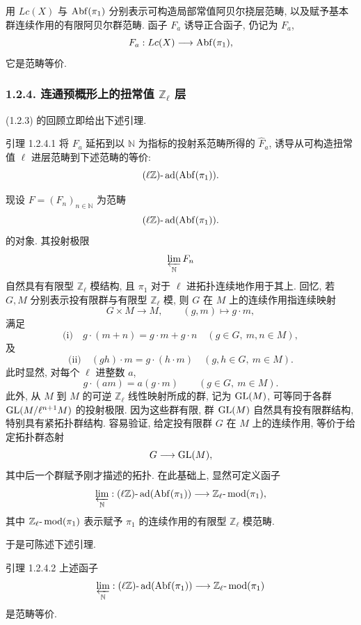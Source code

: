 用 \(Lc(X)\) 与 \(\operatorname{Abf}(\pi_1)\) 分别表示可构造局部常值阿贝尔挠层范畴, 以及赋予基本群连续作用的有限阿贝尔群范畴. 函子 \(F_a\) 诱导正合函子, 仍记为 \(F_a\),
\[
F_a:Lc(X)\longrightarrow \operatorname{Abf}(\pi_1),
\]
它是范畴等价.

\subsubsection*{1.2.4. 连通预概形上的扭常值 \(\mathbb Z_\ell\) 层}

(1.2.3) 的回顾立即给出下述引理.

\begin{statement}{引理 1.2.4.1}
将 \(F_a\) 延拓到以 \(\mathbb N\) 为指标的投射系范畴所得的 \(\widehat F_a\), 诱导从可构造扭常值 \(\ell\) 进层范畴到下述范畴的等价:
\[
(\ell\mathbb Z)\text{-}\operatorname{ad}(\operatorname{Abf}(\pi_1)).
\]
\end{statement}

现设 \(F=(F_n)_{n\in\mathbb N}\) 为范畴
\[
(\ell\mathbb Z)\text{-}\operatorname{ad}(\operatorname{Abf}(\pi_1)).
\]
的对象. 其投射极限
\[
\varprojlim_{\mathbb N}F_n
\]
自然具有有限型 \(\mathbb Z_\ell\) 模结构, 且 \(\pi_1\) 对于 \(\ell\) 进拓扑连续地作用于其上. 回忆, 若 \(G,M\) 分别表示投有限群与有限型 \(\mathbb Z_\ell\) 模, 则 \(G\) 在 \(M\) 上的连续作用指连续映射
\[
G\times M\longrightarrow M,\qquad (g,m)\longmapsto g\cdot m,
\]
满足
\[
\text{(i)}\quad g\cdot(m+n)=g\cdot m+g\cdot n\quad (g\in G,\ m,n\in M),
\]
及
\[
\text{(ii)}\quad (gh)\cdot m=g\cdot(h\cdot m)\quad (g,h\in G,\ m\in M).
\]
此时显然, 对每个 \(\ell\) 进整数 \(a\),
\[
g\cdot(am)=a(g\cdot m)\qquad (g\in G,\ m\in M).
\]
此外, 从 \(M\) 到 \(M\) 的可逆 \(\mathbb Z_\ell\) 线性映射所成的群, 记为 \(\operatorname{GL}(M)\), 可等同于各群 \(\operatorname{GL}(M/\ell^{n+1}M)\) 的投射极限. 因为这些群有限, 群 \(\operatorname{GL}(M)\) 自然具有投有限群结构, 特别具有紧拓扑群结构. 容易验证, 给定投有限群 \(G\) 在 \(M\) 上的连续作用, 等价于给定拓扑群态射
\[
G\longrightarrow \operatorname{GL}(M),
\]
其中后一个群赋予刚才描述的拓扑. 在此基础上, 显然可定义函子
\[
\varprojlim_{\mathbb N}:(\ell\mathbb Z)\text{-}\operatorname{ad}(\operatorname{Abf}(\pi_1))\longrightarrow
\mathbb Z_\ell\text{-}\operatorname{mod}(\pi_1),
\]
其中 \(\mathbb Z_\ell\text{-}\operatorname{mod}(\pi_1)\) 表示赋予 \(\pi_1\) 的连续作用的有限型 \(\mathbb Z_\ell\) 模范畴.

于是可陈述下述引理.

\begin{statement}{引理 1.2.4.2}
上述函子
\[
\varprojlim_{\mathbb N}:(\ell\mathbb Z)\text{-}\operatorname{ad}(\operatorname{Abf}(\pi_1))
\longrightarrow \mathbb Z_\ell\text{-}\operatorname{mod}(\pi_1)
\]
是范畴等价.
\end{statement}

